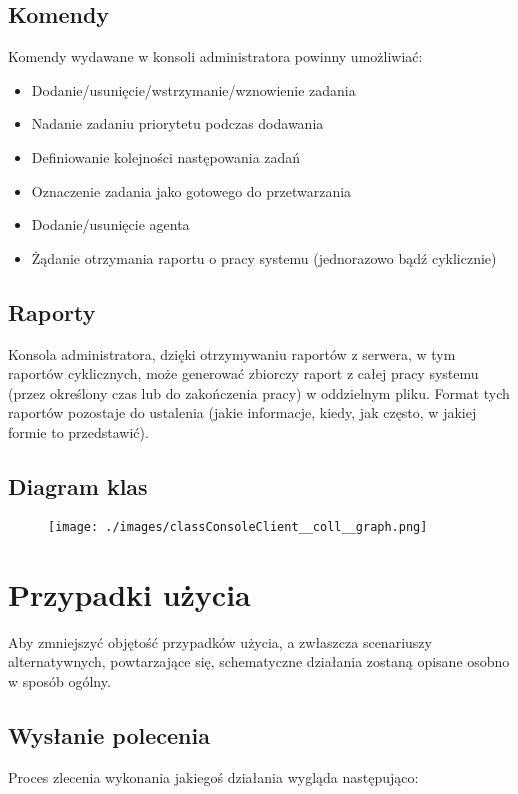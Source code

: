 \documentclass[10pt,a4paper]{article}
\begin{document}
		\subsection{Komendy}
			Komendy wydawane w konsoli administratora powinny umożliwiać:
			
			\begin{itemize}   
				\item Dodanie/usunięcie/wstrzymanie/wznowienie zadania
				\item Nadanie zadaniu priorytetu podczas dodawania
				\item Definiowanie kolejności następowania zadań
				\item Oznaczenie zadania jako gotowego do przetwarzania
				\item Dodanie/usunięcie agenta
				\item Żądanie otrzymania raportu o pracy systemu (jednorazowo bądź cyklicznie)
			\end{itemize}
		
		\subsection{Raporty}
			Konsola administratora, dzięki otrzymywaniu raportów z serwera, w tym raportów cyklicznych, może generować zbiorczy raport z całej pracy systemu (przez określony czas lub do zakończenia pracy) w oddzielnym pliku. Format tych raportów pozostaje do ustalenia (jakie informacje, kiedy, jak często, w jakiej formie to przedstawić).
			
    	\subsection{Diagram klas}
		    \begin{figure}[H]
				\texttt{[image: ./images/classConsoleClient\_\_coll\_\_graph.png]}
		    \end{figure}  
		      
    \section{Przypadki użycia}
        Aby zmniejszyć objętość przypadków użycia, a zwłaszcza scenariuszy alternatywnych, powtarzające się, schematyczne działania zostaną opisane osobno w sposób ogólny.                    
        
        \subsection{Wysłanie polecenia}
            Proces zlecenia wykonania jakiegoś działania wygląda następująco:
            
\end{document}
